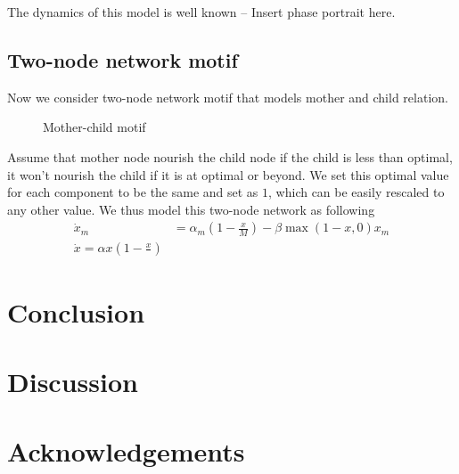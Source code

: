 \documentclass{article}
\begin{document}
The dynamics of this model is well known -- Insert phase portrait here.

\subsection{Two-node network motif}
Now we consider two-node network motif that models mother and child relation.
\begin{figure}[!htb]
\centering
{}
 \caption{Mother-child motif}
 \label{F:Mother-Child}
\end{figure}
Assume that mother node nourish the child node if the child is less than optimal, it won't nourish the child if it is at optimal or beyond. We set this optimal value for each component to be the same and set as $1$, which can be easily rescaled to any other value. We thus model this two-node network as following
\begin{equation}
\begin{array}{cc}
    \dot x_m  & = \alpha_m(1-\frac{x}{M}) - \beta \max(1-x, 0) x_m  \\
     \dot x = \alpha x(1-\frac{x}{})& 
\end{array}
\end{equation}



\section{Conclusion}
\section{Discussion}
\section*{Acknowledgements}




\printbibliography
\end{document}
